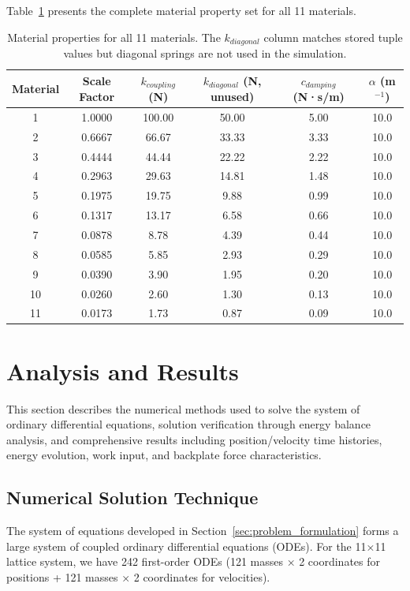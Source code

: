 \documentclass[11pt,a4paper]{article}
\begin{document}
\noindent Table~\ref{tab:material_properties} presents the complete material property set for all 11 materials.

\begin{table}[h]
\centering
\caption{Material properties for all 11 materials. The $k_{diagonal}$ column matches stored tuple values but diagonal springs are not used in the simulation.}
\label{tab:material_properties}
\small
\begin{tabular}{cccccc}
\toprule
Material & Scale Factor & $k_{coupling}$ (N) & $k_{diagonal}$ (N, unused) & $c_{damping}$ (N·s/m) & $\alpha$ (m$^{-1}$) \\
\midrule
1 & 1.0000 & 100.00 & 50.00 & 5.00 & 10.0 \\
2 & 0.6667 & 66.67 & 33.33 & 3.33 & 10.0 \\
3 & 0.4444 & 44.44 & 22.22 & 2.22 & 10.0 \\
4 & 0.2963 & 29.63 & 14.81 & 1.48 & 10.0 \\
5 & 0.1975 & 19.75 & 9.88 & 0.99 & 10.0 \\
6 & 0.1317 & 13.17 & 6.58 & 0.66 & 10.0 \\
7 & 0.0878 & 8.78 & 4.39 & 0.44 & 10.0 \\
8 & 0.0585 & 5.85 & 2.93 & 0.29 & 10.0 \\
9 & 0.0390 & 3.90 & 1.95 & 0.20 & 10.0 \\
10 & 0.0260 & 2.60 & 1.30 & 0.13 & 10.0 \\
11 & 0.0173 & 1.73 & 0.87 & 0.09 & 10.0 \\
\bottomrule
\end{tabular}
\end{table}

\section{Analysis and Results}
\label{sec:analysis}

\noindent This section describes the numerical methods used to solve the system of ordinary differential equations, solution verification through energy balance analysis, and comprehensive results including position/velocity time histories, energy evolution, work input, and backplate force characteristics.

\subsection{Numerical Solution Technique}

\noindent The system of equations developed in Section~\ref{sec:problem_formulation} forms a large system of coupled ordinary differential equations (ODEs). For the 11×11 lattice system, we have 242 first-order ODEs (121 masses × 2 coordinates for positions + 121 masses × 2 coordinates for velocities).
\end{document}
